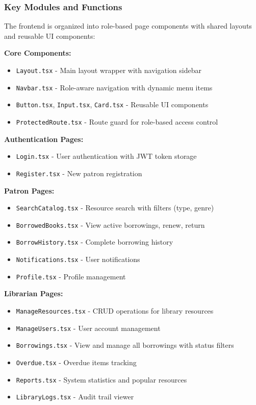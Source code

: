 \documentclass[11pt,a4paper]{article}
\begin{document}
\subsubsection{Key Modules and Functions}

The frontend is organized into role-based page components with shared layouts and reusable UI components:

\textbf{Core Components:}
\begin{itemize}
    \item \texttt{Layout.tsx} - Main layout wrapper with navigation sidebar
    \item \texttt{Navbar.tsx} - Role-aware navigation with dynamic menu items
    \item \texttt{Button.tsx}, \texttt{Input.tsx}, \texttt{Card.tsx} - Reusable UI components
    \item \texttt{ProtectedRoute.tsx} - Route guard for role-based access control
\end{itemize}

\textbf{Authentication Pages:}
\begin{itemize}
    \item \texttt{Login.tsx} - User authentication with JWT token storage
    \item \texttt{Register.tsx} - New patron registration
\end{itemize}

\textbf{Patron Pages:}
\begin{itemize}
    \item \texttt{SearchCatalog.tsx} - Resource search with filters (type, genre)
    \item \texttt{BorrowedBooks.tsx} - View active borrowings, renew, return
    \item \texttt{BorrowHistory.tsx} - Complete borrowing history
    \item \texttt{Notifications.tsx} - User notifications
    \item \texttt{Profile.tsx} - Profile management
\end{itemize}

\textbf{Librarian Pages:}
\begin{itemize}
    \item \texttt{ManageResources.tsx} - CRUD operations for library resources
    \item \texttt{ManageUsers.tsx} - User account management
    \item \texttt{Borrowings.tsx} - View and manage all borrowings with status filters
    \item \texttt{Overdue.tsx} - Overdue items tracking
    \item \texttt{Reports.tsx} - System statistics and popular resources
    \item \texttt{LibraryLogs.tsx} - Audit trail viewer
\end{itemize}
\end{document}
